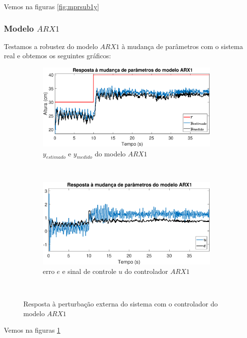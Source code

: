 Vemos na figuras \ref{fig:mprsub1y}

\subsubsection{Modelo $ARX1$}
Testamos a robustez do modelo $ARX1$ à mudança de parâmetros com o sistema real e obtemos os seguintes gráficos:
\begin{figure}[htb]
	\centering
	\begin{subfigure}[t]{0.48\textwidth}
		\includegraphics[width=1\linewidth]{mprarx1y}
		\caption[$y_{estimado}$ e $y_{medido}$ do modelo $ARX1$]{$y_{estimado}$ e $y_{medido}$ do modelo $ARX1$}
		\label{fig:mprarx1y}
	\end{subfigure}
	~ %
	\begin{subfigure}[t]{0.48\textwidth}
		\includegraphics[width=1\linewidth]{mprarx1e}
		\caption[erro $e$ e sinal de controle $u$ do controlador $ARX1$]{erro $e$ e sinal de controle $u$ do controlador $ARX1$}
		\label{fig:mprarx1e}
	\end{subfigure}
	~ %
	
	\caption{Resposta à perturbação externa do sistema com o controlador do modelo $ARX1$}\label{fig:mprarx1}
\end{figure}
Vemos na figuras \ref{fig:mprarx1y}

